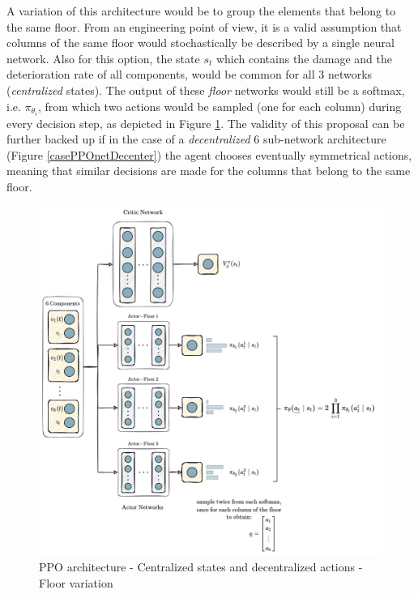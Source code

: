 \newpage

A variation of this architecture would be to group the elements that belong to the same floor. From an engineering point of view, it is a valid assumption that columns of the same floor would stochastically be described by a single neural network. Also for this option, the state $s_t$ which contains the damage and the deterioration rate of all components, would be common for all 3 networks (\textit{centralized} states). The output of these \textit{floor} networks would still be a softmax, i.e. $\pi _{\theta_i}$, from which two actions would be sampled (one for each column) during every decision step, as depicted in Figure \ref{casePPOnetPerFloor}. The validity of this proposal can be further backed up if in the case of a \textit{decentralized} 6 sub-network architecture (Figure \ref{casePPOnetDecenter}) the agent chooses eventually symmetrical actions, meaning that similar decisions are made for the columns that belong to the same floor.

\begin{figure}[H]
    \centering
    \includegraphics[width=\textwidth]{Figures/neuralNetPerFloor.png}
	\caption{\gls{PPO} architecture - Centralized states and decentralized actions - Floor variation}
	\label{casePPOnetPerFloor}
\end{figure}

